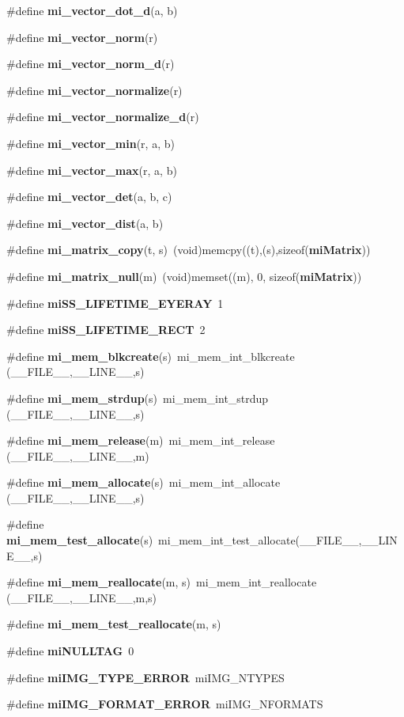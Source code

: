 \begin{CompactItemize}
\#define {\bf mi\_\-vector\_\-dot\_\-d}(a, b)
\item 
\#define {\bf mi\_\-vector\_\-norm}(r)
\item 
\#define {\bf mi\_\-vector\_\-norm\_\-d}(r)
\item 
\#define {\bf mi\_\-vector\_\-normalize}(r)
\item 
\#define {\bf mi\_\-vector\_\-normalize\_\-d}(r)
\item 
\#define {\bf mi\_\-vector\_\-min}(r, a, b)
\item 
\#define {\bf mi\_\-vector\_\-max}(r, a, b)
\item 
\#define {\bf mi\_\-vector\_\-det}(a, b, c)
\item 
\#define {\bf mi\_\-vector\_\-dist}(a, b)
\item 
\#define {\bf mi\_\-matrix\_\-copy}(t, s)\ (void)memcpy((t),(s),sizeof({\bf mi\-Matrix}))
\item 
\#define {\bf mi\_\-matrix\_\-null}(m)\ (void)memset((m), 0, sizeof({\bf mi\-Matrix}))
\item 
\#define {\bf mi\-SS\_\-LIFETIME\_\-EYERAY}\ 1
\item 
\#define {\bf mi\-SS\_\-LIFETIME\_\-RECT}\ 2
\item 
\#define {\bf mi\_\-mem\_\-blkcreate}(s)\ mi\_\-mem\_\-int\_\-blkcreate	(\_\-\_\-FILE\_\-\_\-,\_\-\_\-LINE\_\-\_\-,s)
\item 
\#define {\bf mi\_\-mem\_\-strdup}(s)\ mi\_\-mem\_\-int\_\-strdup	(\_\-\_\-FILE\_\-\_\-,\_\-\_\-LINE\_\-\_\-,s)
\item 
\#define {\bf mi\_\-mem\_\-release}(m)\ mi\_\-mem\_\-int\_\-release	(\_\-\_\-FILE\_\-\_\-,\_\-\_\-LINE\_\-\_\-,m)
\item 
\#define {\bf mi\_\-mem\_\-allocate}(s)\ mi\_\-mem\_\-int\_\-allocate	(\_\-\_\-FILE\_\-\_\-,\_\-\_\-LINE\_\-\_\-,s)
\item 
\#define {\bf mi\_\-mem\_\-test\_\-allocate}(s)\ mi\_\-mem\_\-int\_\-test\_\-allocate(\_\-\_\-FILE\_\-\_\-,\_\-\_\-LINE\_\-\_\-,s)
\item 
\#define {\bf mi\_\-mem\_\-reallocate}(m, s)\ mi\_\-mem\_\-int\_\-reallocate	(\_\-\_\-FILE\_\-\_\-,\_\-\_\-LINE\_\-\_\-,m,s)
\item 
\#define {\bf mi\_\-mem\_\-test\_\-reallocate}(m, s)
\item 
\#define {\bf mi\-NULLTAG}\ 0
\item 
\#define {\bf mi\-IMG\_\-TYPE\_\-ERROR}\ mi\-IMG\_\-NTYPES
\item 
\#define {\bf mi\-IMG\_\-FORMAT\_\-ERROR}\ mi\-IMG\_\-NFORMATS

\end{CompactItemize}
